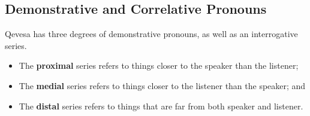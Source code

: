 \documentclass[grammar]{subfiles}
\begin{document}


\subsection{Demonstrative and Correlative Pronouns}
\label{ssec:nm_demonstrative_pronouns}

Qevesa has three degrees of demonstrative pronouns, as well as an interrogative series.

\begin{itemize}
  \item The \textbf{proximal} series refers to things closer to the speaker than the listener;
  \item The \textbf{medial} series refers to things closer to the listener than the speaker; and
  \item The \textbf{distal} series refers to things that are far from both speaker and listener.
\end{itemize}
\end{document}
